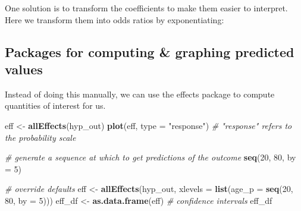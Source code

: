 \documentclass[
]{book}
\newenvironment{Shaded}{\begin{snugshade}}{\end{snugshade}}
\newcommand{\CommentTok}[1]{\textcolor[rgb]{0.56,0.35,0.01}{\textit{#1}}}
\newcommand{\DataTypeTok}[1]{\textcolor[rgb]{0.13,0.29,0.53}{#1}}
\newcommand{\DecValTok}[1]{\textcolor[rgb]{0.00,0.00,0.81}{#1}}
\newcommand{\KeywordTok}[1]{\textcolor[rgb]{0.13,0.29,0.53}{\textbf{#1}}}
\newcommand{\NormalTok}[1]{#1}
\newcommand{\OperatorTok}[1]{\textcolor[rgb]{0.81,0.36,0.00}{\textbf{#1}}}
\newcommand{\StringTok}[1]{\textcolor[rgb]{0.31,0.60,0.02}{#1}}
\begin{document}
One solution is to transform the coefficients to make them easier to interpret.
Here we transform them into odds ratios by exponentiating:

\begin{Shaded}
\end{Shaded}

\hypertarget{packages-for-computing-graphing-predicted-values}{%
\subsection{Packages for computing \& graphing predicted values}\label{packages-for-computing-graphing-predicted-values}}

Instead of doing this manually, we can use the effects package to compute quantities of interest for us.

\begin{Shaded}
\begin{Highlighting}[]
\NormalTok{  eff <-}\StringTok{ }\KeywordTok{allEffects}\NormalTok{(hyp_out)}
  \KeywordTok{plot}\NormalTok{(eff, }\DataTypeTok{type =} \StringTok{"response"}\NormalTok{) }\CommentTok{# "response" refers to the probability scale}

  \CommentTok{# generate a sequence at which to get predictions of the outcome}
  \KeywordTok{seq}\NormalTok{(}\DecValTok{20}\NormalTok{, }\DecValTok{80}\NormalTok{, }\DataTypeTok{by =} \DecValTok{5}\NormalTok{)}

  \CommentTok{# override defaults}
\NormalTok{  eff <-}\StringTok{ }\KeywordTok{allEffects}\NormalTok{(hyp_out, }\DataTypeTok{xlevels =} \KeywordTok{list}\NormalTok{(}\DataTypeTok{age_p =} \KeywordTok{seq}\NormalTok{(}\DecValTok{20}\NormalTok{, }\DecValTok{80}\NormalTok{, }\DataTypeTok{by =} \DecValTok{5}\NormalTok{)))}
\NormalTok{  eff_df <-}\StringTok{ }\KeywordTok{as.data.frame}\NormalTok{(eff) }\CommentTok{# confidence intervals}
\NormalTok{  eff_df}
\end{Highlighting}
\end{Shaded}
\end{document}
